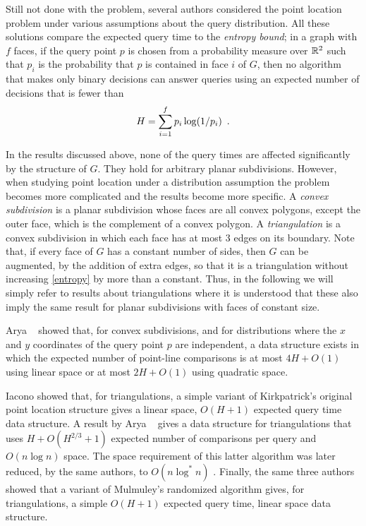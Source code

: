 \documentclass[charterfonts,lotsofwhite]{patmorin}
\begin{document}
Still not done with the problem, several authors considered the point
location problem under various assumptions about the query
distribution.  All these solutions compare the expected query time to
the \emph{entropy bound};  in a graph with $f$ faces, if the query
point $p$ is chosen from a probability measure over $\mathbb{R}^2$ such that
$p_i$ is the probability that $p$ is contained in face $i$ of $G$,
then no algorithm that makes only binary decisions can answer queries
using an expected number of decisions that is fewer than 
\begin{equation}
    H = \sum_{i=1}^f p_i\log(1/p_i) \enspace . \eqlabel{entropy}
\end{equation}

In the results discussed above, none of the query times are affected
significantly by the structure of $G$.  They hold for arbitrary planar
subdivisions.  However, when studying point location under a
distribution assumption the problem becomes more complicated and the
results become more specific.  A \emph{convex subdivision} is a planar
subdivision whose faces are all convex polygons, except the outer
face, which is the complement of a convex polygon.  A
\emph{triangulation} is a convex subdivision in which each face has at
most 3 edges on its boundary.  Note that, if every face of $G$ has a
constant number of sides, then $G$ can be augmented, by the addition
of extra edges, so that it is a triangulation without increasing
\eqref{entropy} by more than a constant.  Thus, in the following we
will simply refer to results about triangulations where it is
understood that these also imply the same result for planar
subdivisions with faces of constant size.

Arya \etal\ \cite{acmr00} showed that, for convex subdivisions, and for
distributions where the $x$ and $y$ coordinates of the query point $p$ are
independent, a data structure exists in which the expected number of
point-line comparisons is at most $4H+O(1)$ using linear space or at
most $2H+O(1)$ using quadratic space.

Iacono \cite{i01,i04} showed that, for triangulations, a simple
variant of Kirkpatrick's original point location structure gives a
linear space, $O(H+1)$ expected query time data structure.  A result
by Arya \etal\ \cite{amm00} gives a data structure for triangulations
that uses $H + O(H^{2/3}+1)$ expected number of comparisons per query
and $O(n\log n)$ space.  The space requirement of this latter
algorithm was later reduced, by the same authors, to $O(n\log^* n)$
\cite{amm01a}.  Finally, the same three authors \cite{amm01b} showed
that a variant of Mulmuley's randomized algorithm gives, for
triangulations, a simple $O(H+1)$ expected query time, linear space
data structure.
\end{document}
